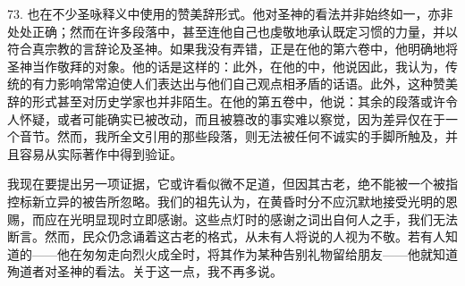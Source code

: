 73. 也在不少圣咏释义中使用的赞美辞形式。他对圣神的看法并非始终如一，亦非处处正确；然而在许多段落中，甚至连他自己也虔敬地承认既定习惯的力量，并以符合真宗教的言辞论及圣神。如果我没有弄错，正是在他的第六卷中，他明确地将圣神当作敬拜的对象。他的话是这样的：此外，在他的中，他说因此，我认为，传统的有力影响常常迫使人们表达出与他们自己观点相矛盾的话语。此外，这种赞美辞的形式甚至对历史学家也并非陌生。在他的第五卷中，他说：其余的段落或许令人怀疑，或者可能确实已被改动，而且被篡改的事实难以察觉，因为差异仅在于一个音节。然而，我所全文引用的那些段落，则无法被任何不诚实的手脚所触及，并且容易从实际著作中得到验证。\par

我现在要提出另一项证据，它或许看似微不足道，但因其古老，绝不能被一个被指控标新立异的被告所忽略。我们的祖先认为，在黄昏时分不应沉默地接受光明的恩赐，而应在光明显现时立即感谢。这些点灯时的感谢之词出自何人之手，我们无法断言。然而，民众仍念诵着这古老的格式，从未有人将说的人视为不敬。若有人知道的——他在匆匆走向烈火成全时，将其作为某种告别礼物留给朋友——他就知道殉道者对圣神的看法。关于这一点，我不再多说。\par


